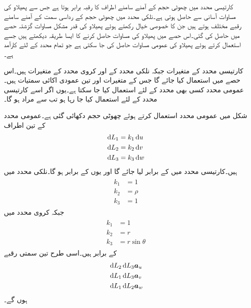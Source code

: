 کارتیسی محدد میں چھوٹی حجم کے آمنے سامنے اطراف کا رقبہ برابر ہوتا ہے جس سے پھیلاو کی مساوات آسانی سے حاصل ہوتی ہے۔نلکی محدد میں چھوٹی حجم کے رداسی سمت کے آمنے سامنے رقبے مختلف ہوتے ہیں جن کا خصوصی خیال رکھتے ہوئے پھیلاو کی قدر مشکل مساوات گزشتہ حصے میں حاصل کی گئی۔اس حصے میں پھیلاو کی مساوات حاصل کرنے کا ایسا طریقہ دیکھتے ہیں جسے استعمال کرتے ہوئے پھیلاو کی عمومی مساوات حاصل کی جا سکتی ہے جو تمام محدد کے لئے کارآمد ہے۔

کارتیسی محدد کے متغیرات  جبکہ نلکی محدد کے   اور کروی محدد  کے متغیرات  ہیں۔اس حصے میں   استعمال کیا جائے گا جس کے متغیرات   اور  تین عمودی اکائی سمتیات  ہیں۔عمومی محدد کسی بھی محدد کے لئے استعمال کیا جا سکتا ہے۔یوں اگر اسے کارتیسی محدد کے لئے استعمال کیا جا رہا ہو تب   سے مراد  ہو گا۔
 
شکل میں عمومی محدد استعمال کرتے ہوئے چھوٹی حجم دکھائی گئی ہے۔عمومی محدد کے تین اطراف
\begin{align*}
\dif L_1 &= k_1 \dif u \\
\dif L_2 &= k_2 \dif v \\
\dif L_3 &= k_3 \dif w 
\end{align*}
ہیں۔کارتیسی محدد میں  کے برابر لیا جائے گا اور یوں  کے برابر ہو گا۔نلکی محدد میں
\begin{gather}
\begin{aligned}\label{مساوات_گاؤس_نلکی_اطراف_کے_مستقل}
k_1&=1\\
k_2&=\rho\\
k_3&=1
\end{aligned}
\end{gather}
جبکہ کروی محدد میں
\begin{gather}
\begin{aligned}\label{مساوات_گاؤس_کروی_اطراف_کے_مستقل}
k_1&=1\\
k_2&=r\\
k_3&=r \sin \theta
\end{aligned}
\end{gather}
کے برابر ہیں۔اسی طرح تین سمتی رقبے
\begin{align*}
& \dif L_2 \dif L_3 \au\\
&\dif L_1 \dif L_3 \av\\
&\dif L_1 \dif L_2 \aw
\end{align*}
ہوں گے۔

